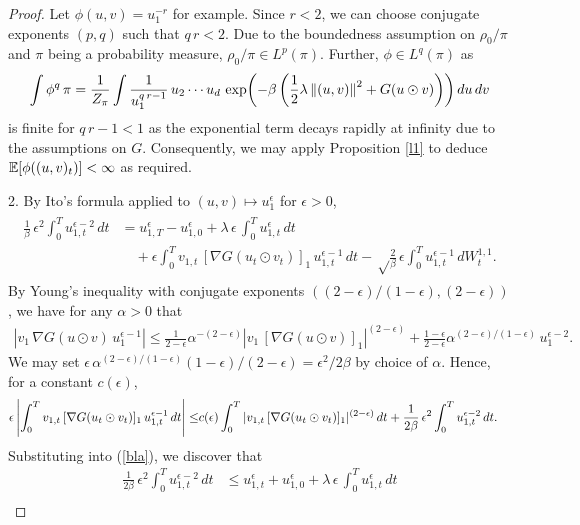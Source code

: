 \documentclass[11pt, twoside]{report}
\begin{document}
\begin{proof}  
Let $\phi(u,v)=u_1^{-r}$ for example. Since $r<2$, we can choose conjugate exponents  $(p,q)$ such that $q\,r<2$. Due to the boundedness assumption on $\rho_0/\pi$ and $\pi$ being a probability measure, $\rho_0/\pi\in L^p(\pi)$. Further, $\phi\in L^q(\pi)$  as \[
\int \phi^q\, \pi = \frac{1}{Z_{\pi}} \int\frac{1}{u_1^{q\,r-1}} \,u_2\cdots u_d\, \exp\pp{-\beta\,\pp{\frac 12 \lambda\,\norm{(u,v)}^2 + G(u\odot v)}
}\,du\,dv\]
is finite for $q\,r-1<1$ as the exponential term decays rapidly at infinity due to the assumptions on $G$. Consequently, we may apply Proposition \ref{l1} to deduce $\mean{\phi((u,v)_t)}<\infty$ as required.

2.  By Ito's formula applied to $(u,v)\mapsto u_1^\epsilon$ for $\epsilon>0$,
 \begin{gather}
     \begin{split}
\frac{1}{\beta}\,\epsilon^2\int_0^T {u_{1,t}^{\epsilon-2}}\,dt
&=
{u_{1,T}^\epsilon}-{u_{1,0}^\epsilon}+\lambda\,\epsilon\,\int_0^T {u_{1,t}^\epsilon}\,dt\\
&\quad+ \epsilon\int_0^T v_{1,t} \,[\nabla G(u_t\odot v_t)]_1 \,u_{1,t}^{\epsilon-1}\,dt-\sqrt\frac{2}{\beta} \,\epsilon\int_0^T u_{1,t}^{\epsilon-1}\,dW^{1,1}_t.
\end{split}\label{bla}\end{gather}
By Young's inequality with conjugate exponents $((2-\epsilon)/(1-\epsilon),(2-\epsilon))$, we have for any $\alpha>0$ that
\begin{align*} |v_1 \,\nabla G(u\odot v) \,u_1^{\epsilon-1}|\le
\frac{1}{2-\epsilon} \alpha^{-(2-\epsilon)} |v_1 \,[\nabla G(u\odot v)]_1 |^{(2-\epsilon)}+
\frac{1-\epsilon}{2-\epsilon}\alpha^{(2-\epsilon)/(1-\epsilon)}\,u_1^{\epsilon-2}.
\end{align*}
We may set $\epsilon\,\alpha^{(2-\epsilon)/(1-\epsilon)}(1-\epsilon)/(2-\epsilon)=\epsilon^2/2\beta$ by choice of $\alpha$. Hence,  for a constant $c(\epsilon)$,
\begin{align*}
\epsilon\,\abs{\int_0^T v_{1,t} \,[\nabla G(u_t\odot v_t)]_1\,u_{1,t}^{\epsilon-1}\,dt} \le& 
c(\epsilon)\int_0^T  |v_{1,t} \,[\nabla G(u_t\odot v_t)]_1 |^{(2-\epsilon)}\,dt + \frac{1}{2\beta}\,\epsilon^2\int_0^T {u_{1,t}^{\epsilon-2}}\,dt.
\end{align*}
Substituting into (\ref{bla}), we discover that
 \begin{align*}
\frac{1}{2\beta}\,\epsilon^2\int_0^T {u_{1,t}^{\epsilon-2}}\,dt
&\le
{u_{1,t}^\epsilon}+{u_{1,0}^\epsilon}+\lambda\,\epsilon\,\int_0^T {u_{1,t}^\epsilon}\,dt\\

\end{align*}
\end{proof}
\end{document}

